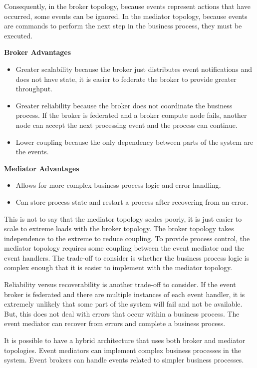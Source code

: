 Consequently, in the broker topology, because events represent actions that have occurred, some events can be ignored.
In the mediator topology, because events are commands to perform the next step in the business process, they must be executed.

\bigskip\noindent
\textbf{Broker Advantages}

\begin{itemize}
    \item Greater scalability because the broker just distributes event notifications and does not have state,
            it is easier to federate the broker to provide greater throughput.
    \item Greater reliability because the broker does not coordinate the business process.
            If the broker is federated and a broker compute node fails, another node can accept the next processing event and the process can continue.
    \item Lower coupling because the only dependency between parts of the system are the events.
\end{itemize}

\noindent
\textbf{Mediator Advantages}

\begin{itemize}
    \item Allows for more complex business process logic and error handling.
    \item Can store process state and restart a process after recovering from an error.
\end{itemize}

This is not to say that the mediator topology scales poorly, it is just easier to scale to extreme loads with the broker topology.
The broker topology takes independence to the extreme to reduce coupling.
To provide process control, the mediator topology requires some coupling between the event mediator and the event handlers.
The trade-off to consider is whether the business process logic is complex enough that it is easier to implement with the mediator topology.

Reliability versus recoverability is another trade-off to consider.
If the event broker is federated and there are multiple instances of each event handler,
it is extremely unlikely that some part of the system will fail and not be available.
But, this does not deal with errors that occur within a business process.
The event mediator can recover from errors and complete a business process.

It is possible to have a hybrid architecture that uses both broker and mediator topologies.
Event mediators can implement complex business processes in the system.
Event brokers can handle events related to simpler business processes.


